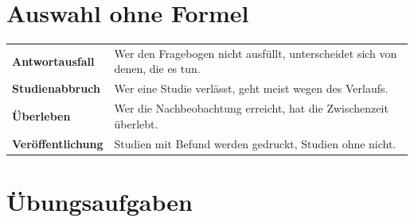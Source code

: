 \section{Auswahl ohne Formel}

\begin{merksatz}
\begin{center}
{\small
\renewcommand{\arraystretch}{1.52}
\begin{tabular}{@{}P{3.0cm}P{5.6cm}@{}}
\toprule
\textbf{Antwortausfall} & Wer den Fragebogen nicht ausfüllt, unterscheidet sich von denen, die es tun.\\
\textbf{Studienabbruch} & Wer eine Studie verlässt, geht meist wegen des Verlaufs.\\
\textbf{Überleben} & Wer die Nachbeobachtung erreicht, hat die Zwischenzeit überlebt.\\
\textbf{Veröffentlichung} & Studien mit Befund werden gedruckt, Studien ohne nicht.\\
\bottomrule
\end{tabular}}
\end{center}

\begin{center}
\begin{minipage}{0.88\textwidth}
\end{minipage}
\end{center}
\end{merksatz}

\section{Übungsaufgaben}

